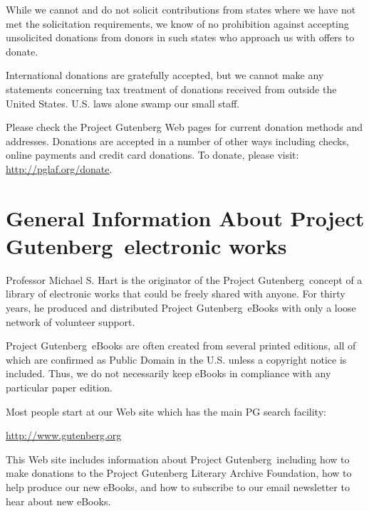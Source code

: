 While we cannot and do not solicit contributions from states where we
have not met the solicitation requirements, we know of no prohibition
against accepting unsolicited donations from donors in such states who
approach us with offers to donate.

International donations are gratefully accepted, but we cannot make
any statements concerning tax treatment of donations received from
outside the United States.  U.S. laws alone swamp our small staff.

Please check the Project Gutenberg Web pages for current donation
methods and addresses.  Donations are accepted in a number of other
ways including checks, online payments and credit card donations.
To donate, please visit: \url{http://pglaf.org/donate}.


\section[General Information]
{General Information About Project Gutenberg\texttrademark\ electronic works}
\label{license:sec:general-info}

Professor Michael S. Hart is the originator of the Project
Gutenberg\texttrademark\ concept of a library of
electronic works that could be freely shared with anyone.  For thirty
years, he produced and distributed Project
Gutenberg\texttrademark\ eBooks with only a loose
network of volunteer support.


Project Gutenberg\texttrademark\ eBooks are often
created from several printed editions, all of which are confirmed as
Public Domain in the U.S.  unless a copyright notice is included.
Thus, we do not necessarily keep eBooks in compliance with any
particular paper edition.

Most people start at our Web site which has the main PG search
facility:

\begin{center}
  \url{http://www.gutenberg.org}
\end{center}

This Web site includes information about Project
Gutenberg\texttrademark\, including how to make
donations to the Project Gutenberg Literary Archive Foundation, how to
help produce our new eBooks, and how to subscribe to our email
newsletter to hear about new eBooks.
